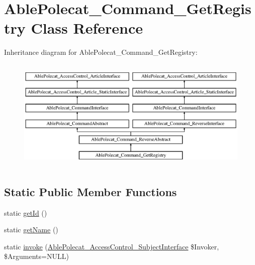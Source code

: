 \hypertarget{class_able_polecat___command___get_registry}{}\section{Able\+Polecat\+\_\+\+Command\+\_\+\+Get\+Registry Class Reference}
\label{class_able_polecat___command___get_registry}
Inheritance diagram for Able\+Polecat\+\_\+\+Command\+\_\+\+Get\+Registry\+:\begin{figure}[H]
\begin{center}
\leavevmode
\includegraphics[height=5.419355cm]{class_able_polecat___command___get_registry}
\end{center}
\end{figure}
\subsection*{Static Public Member Functions}
\begin{DoxyCompactItemize}
\item 
static \hyperlink{class_able_polecat___command___get_registry_acfaa3a96d0cb5a4c0d4d710dcba41e9e}{get\+Id} ()
\item 
static \hyperlink{class_able_polecat___command___get_registry_a4ef9bd37ba3ce8a13c1e8bcf4f72a630}{get\+Name} ()
\item 
static \hyperlink{class_able_polecat___command___get_registry_a6821480fe527af0afdf3691d7cffad5f}{invoke} (\hyperlink{interface_able_polecat___access_control___subject_interface}{Able\+Polecat\+\_\+\+Access\+Control\+\_\+\+Subject\+Interface} \$Invoker, \$Arguments=N\+U\+L\+L)
\end{DoxyCompactItemize}
